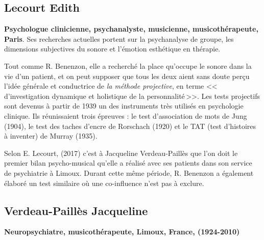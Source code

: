        \subsection{Lecourt Edith}
      \textbf{Psychologue clinicienne,
          psychanalyste, musicienne, musicothérapeute, Paris}. Ses recherches
        actuelles portent sur la psychanalyse de groupe, les
        dimensions subjectives du sonore  et l'émotion esthétique en
        thérapie.

   Tout comme R. Benenzon, elle a recherché  la place qu'occupe le sonore dans la vie d'un
        patient, et on peut supposer que tous les deux aient sans doute perçu l'idée générale et
        conductrice de \emph{la méthode projective},
        en terme
	    <<\,d'investigation dynamique et holistique de la
            personnalité\,>>.
            Les tests projectifs sont devenus à partir
        de 1939 un des instruments très utilisés en psychologie
        clinique. Ils réunissaient trois épreuves : le test
        d'association de mots de Jung (1904), le test des taches
        d'encre de Rorschach (1920) et le TAT (test d'histoires à
        inventer) de Murray (1935)\autocite[ch.~1, p.~13] {anzieu.chabert:methodes}.

        Selon E. Lecourt,
(2017)\autocite[ch.~3, p.~84]{lecourt_les_2017}
c'est à Jacqueline Verdeau-Paillès que l'on doit le premier bilan
psycho-musical qu'elle a réalisé avec ses patients dans son service
de psychiatrie à Limoux. Durant cette même période, R.
Benenzon a également élaboré un test similaire
\autocite{benenzon:musicotherapie} où une co-influence n'est pas à exclure.





\subsection{Verdeau-Paillès Jacqueline
}
\textbf{Neuropsychiatre,
  musicothérapeute, Limoux, France, (1924-2010)}

